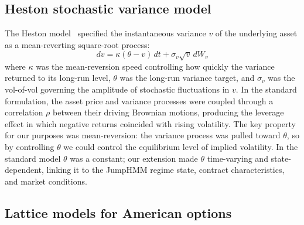 \subsection{Heston stochastic variance model}

The Heston model~\cite{heston1993} specified the instantaneous variance $v$ of the underlying asset as a mean-reverting square-root process:
\begin{equation}\label{eq:heston_standard}
    dv = \kappa(\theta - v)\,dt + \sigma_v \sqrt{v}\,dW_v
\end{equation}
where $\kappa$ was the mean-reversion speed controlling how quickly the variance returned to its long-run level, $\theta$ was the long-run variance target, and $\sigma_v$ was the vol-of-vol governing the amplitude of stochastic fluctuations in $v$. In the standard formulation, the asset price and variance processes were coupled through a correlation $\rho$ between their driving Brownian motions, producing the leverage effect in which negative returns coincided with rising volatility. The key property for our purposes was mean-reversion: the variance process was pulled toward $\theta$, so by controlling $\theta$ we could control the equilibrium level of implied volatility. In the standard model $\theta$ was a constant; our extension made $\theta$ time-varying and state-dependent, linking it to the JumpHMM regime state, contract characteristics, and market conditions.

\subsection{Lattice models for American options}

